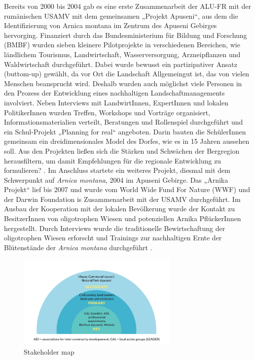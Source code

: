 Bereits von 2000 bis 2004 gab es eine erste Zusammenarbeit der ALU-FR mit der rumänischen USAMV mit dem gemeinsamen „Projekt Apuseni“, aus dem die Identifizierung von Arnica montana im Zentrum des Apuseni Gebirges hervorging. Finanziert durch das Bundesministerium für Bildung und Forschung (BMBF) wurden sieben kleinere Pilotprojekte in verschiedenen Bereichen, wie ländlichem Tourismus, Landwirtschaft, Wasserversorgung, Arzneipflanzen und Waldwirtschaft durchgeführt. Dabei wurde bewusst ein partizipativer Ansatz (buttom-up) gewählt, da vor Ort die Landschaft Allgemeingut ist, das von vielen Menschen beansprucht wird. Deshalb wurden auch möglichst viele Personen in den Prozess der Entwicklung eines nachhaltigen Landschaftmanagements involviert. Neben Interviews mit LandwirtInnen, ExpertInnen und lokalen PolitikerInnen wurden Treffen, Workshops und  Vorträge organisiert, Informationsmaterialien verteilt, Beratungen und Rollenspiel durchgeführt und ein Schul-Projekt „Planning for real“ angeboten. Darin bauten die SchülerInnen gemeinsam ein dreidimensionales Model des Dorfes, wie es in 15 Jahren aussehen soll. Aus den Projekten ließen sich die Stärken und Schwächen der Bergregion herausfiltern, um damit Empfehlungen für die regionale Entwicklung zu formulieren? \citep[vgl.][]{RUSDEA2009}.
Im Anschluss startete ein weiteres Projekt, diesmal mit dem Schwerpunkt auf \textit{Arnica montana}, 2004 im Apuseni Gebirge. Das „Arnika Projekt“ lief bis 2007 und wurde vom World Wide Fund For Nature (WWF) und der Darwin Foundation is Zusammenarbeit mit der USAMV durchgeführt. Im Ausbau der Kooperation mit der lokalen Bevölkerung wurde der Kontakt zu BesitzerInnen von oligotrophen Wiesen und potenziellen Arnika PflückerInnen hergestellt. Durch Interviews wurde die traditionelle Bewirtschaftung der oligotrophen Wiesen erforscht und Trainings zur nachhaltigen Ernte der Blütenstände der \textit{Arnica montana} durchgeführt \citep[vgl.][20]{DBU2018}.

\begin{figure}[htb]
 \centering
 \includegraphics[width=0.7\textwidth,angle=0]{abb/Stakeholder-map}
 \caption{Stakeholder map \citep[nach][]{DBU2018}}
\label{fig:stakeholdermap}
\end{figure}

